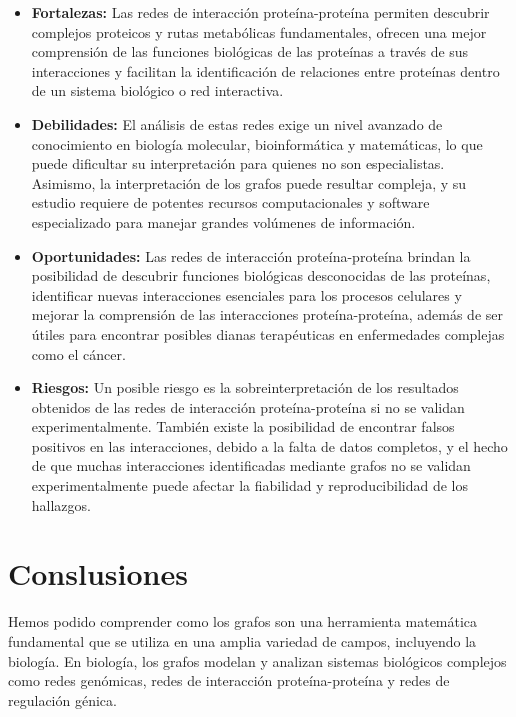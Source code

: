 \documentclass[11pt, a4paper]{article}
\begin{document}
\begin{itemize}
  \item \textbf{Fortalezas:} Las redes de interacción proteína-proteína permiten descubrir complejos proteicos y rutas metabólicas fundamentales, ofrecen una mejor comprensión de las funciones biológicas de las proteínas a través de sus interacciones y facilitan la identificación de relaciones entre proteínas dentro de un sistema biológico o red interactiva.
  \item \textbf{Debilidades:} El análisis de estas redes exige un nivel avanzado de conocimiento en biología molecular, bioinformática y matemáticas, lo que puede dificultar su interpretación para quienes no son especialistas. Asimismo, la interpretación de los grafos puede resultar compleja, y su estudio requiere de potentes recursos computacionales y software especializado para manejar grandes volúmenes de información.
  \item \textbf{Oportunidades:} Las redes de interacción proteína-proteína brindan la posibilidad de descubrir funciones biológicas desconocidas de las proteínas, identificar nuevas interacciones esenciales para los procesos celulares y mejorar la comprensión de las interacciones proteína-proteína, además de ser útiles para encontrar posibles dianas terapéuticas en enfermedades complejas como el cáncer.
  \item \textbf{Riesgos:} Un posible riesgo es la sobreinterpretación de los resultados obtenidos de las redes de interacción proteína-proteína si no se validan experimentalmente. También existe la posibilidad de encontrar falsos positivos en las interacciones, debido a la falta de datos completos, y el hecho de que muchas interacciones identificadas mediante grafos no se validan experimentalmente puede afectar la fiabilidad y reproducibilidad de los hallazgos.
\end{itemize}

\section{Conslusiones}


Hemos podido comprender como los grafos son una herramienta matemática fundamental que se utiliza en una amplia variedad de campos, incluyendo la biología. En biología, los grafos modelan y analizan sistemas biológicos complejos como redes genómicas, redes de interacción proteína-proteína y redes de regulación génica.
\end{document}
